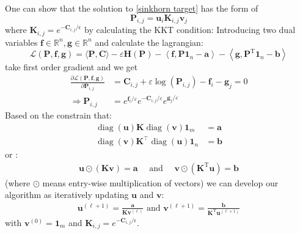 \documentclass{article}
\begin{document}
One can show that the solution to \ref{sinkhorn target} has the form of 
\begin{equation}
\mathbf { P } _ { i , j } = \mathbf { u } _ { i } \mathbf { K } _ { i , j } \mathbf { v } _ { j }
\end{equation}
where $\mathbf { K } _ { i , j } = e^{-\mathbf{C}_{i,j}/\epsilon}$ by calculating the KKT condition:
Introducing two dual variables $\mathbf { f } \in \mathbb { R } ^ { n } , \mathbf { g } \in \mathbb { R } ^ { n }$ and calculate the lagrangian:
\begin{equation}
\mathcal { L } ( \mathbf { P } , \mathbf { f } , \mathbf { g } ) = \langle \mathbf { P } , \mathbf { C } \rangle - \varepsilon \mathbf { H } ( \mathbf { P } ) - \left\langle \mathbf { f } , \mathbf { P } \mathbf { 1 } _ { n } - \mathbf { a } \right\rangle - \left\langle \mathbf { g } , \mathbf { P } ^ { \mathrm { T } } \mathbf{ 1 } _ { n } - \mathbf { b } \right\rangle
\end{equation}
take first order gradient and we get
\begin{align}
\frac { \partial \mathcal { L } ( \mathbf { P } , \mathbf { f } , \mathbf { g } ) } { \partial \mathbf { P } _ { i , j } } &= \mathbf { C } _ { i , j } + \varepsilon \log \left( \mathbf { P } _ { i , j } \right) - \mathbf { f } _ { i } - \mathbf { g } _ { j } = 0\\
\Rightarrow\mathbf { P } _ { i , j } &= e ^ { \mathbf { f } _ { i } / \varepsilon } e ^ { - \mathbf { C } _ { i , j } / \varepsilon } e ^ { \mathbf { g } _ { j } / \varepsilon }
\label{solution for P}
\end{align}
Based on the constrain that:
\begin{align}
\operatorname { diag } ( \mathbf { u } ) \mathbf { K } \operatorname { diag } ( \mathbf { v } ) \mathbf { 1 } _ { m } &= \mathbf { a }\\
\operatorname { diag } ( \mathbf { v } ) \mathbf { K } ^ { \top } \operatorname { diag } ( \mathbf { u } ) \mathbf { 1 } _ { n } &= \mathbf { b }
\end{align}
or :
\begin{align}
\mathbf { u } \odot ( \mathbf { K } \mathbf { v } ) = \mathbf { a } \quad \text { and } \quad \mathbf { v } \odot \left( \mathbf { K } ^ { \mathrm { T } } \mathbf { u } \right) = \mathbf { b }
\label{solution for marginal}
\end{align}
(where $\odot$ means entry-wise multiplication of vectors) we can develop our algorithm as iteratively updating $\mathbf { u }$ and $\mathbf { v }$:
\begin{align}
\mathbf { u } ^ { ( \ell + 1 ) }  { = } \frac { \mathbf { a } } { \mathbf { K } \mathbf { v } ^ { ( \ell ) } } \text { and } \mathbf { v } ^ { ( \ell + 1 ) } { = } \frac { \mathbf { b } } { \mathbf { K } ^ { \mathrm { T } } \mathbf { u } ^ { ( \ell + 1 ) } }
\end{align}
with $\mathbf { v } ^ { ( 0 ) } = \mathbf { 1 } _ { m }$ and $\mathbf { K } _ { i , j } = e^{-\mathbf{C}_{i,j}/\epsilon}$.
\end{document}
